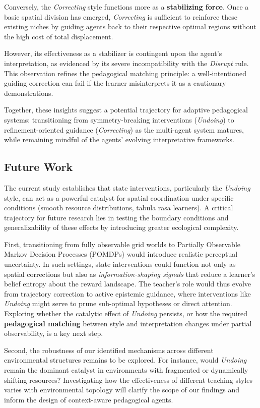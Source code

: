 \documentclass[10pt,letterpaper]{article}
\begin{document}
Conversely, the \emph{Correcting} style functions more as a \textbf{stabilizing force}. Once a basic spatial division has emerged, \emph{Correcting} is sufficient to reinforce these existing niches by guiding agents back to their respective optimal regions without the high cost of total displacement.

However, its effectiveness as a stabilizer is contingent upon the agent's interpretation, as evidenced by its severe incompatibility with the \emph{Disrupt} rule. This observation refines the pedagogical matching principle: a well-intentioned guiding correction can fail if the learner misinterprets it as a cautionary demonstrations.

Together, these insights suggest a potential trajectory for adaptive pedagogical systems: transitioning from symmetry-breaking interventions (\emph{Undoing}) to refinement-oriented guidance (\emph{Correcting}) as the multi-agent system matures, while remaining mindful of the agents' evolving interpretative frameworks.


\subsection{Future Work}
The current study establishes that state interventions, particularly the \emph{Undoing} style, can act as a powerful catalyst for spatial coordination under specific conditions (smooth resource distributions, tabula rasa learners). A critical trajectory for future research lies in testing the boundary conditions and generalizability of these effects by introducing greater ecological complexity.

First, transitioning from fully observable grid worlds to Partially Observable Markov Decision Processes (POMDPs) would introduce realistic perceptual uncertainty. In such settings, state interventions could function not only as spatial corrections but also as \emph{information-shaping signals} that reduce a learner's belief entropy about the reward landscape. The teacher's role would thus evolve from trajectory correction to active epistemic guidance, where interventions like \emph{Undoing} might serve to prune sub-optimal hypotheses or direct attention. Exploring whether the catalytic effect of \emph{Undoing} persists, or how the required \textbf{pedagogical matching} between style and interpretation changes under partial observability, is a key next step.

Second, the robustness of our identified mechanisms across different environmental structures remains to be explored. For instance, would \emph{Undoing} remain the dominant catalyst in environments with fragmented or dynamically shifting resources? Investigating how the effectiveness of different teaching styles varies with environmental topology will clarify the scope of our findings and inform the design of context-aware pedagogical agents.
\end{document}

